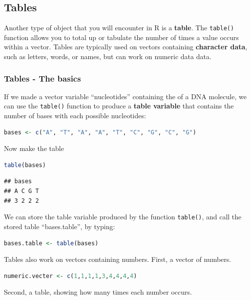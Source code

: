 \documentclass[
]{book}
\newcommand{\passthrough}[1]{#1}
\begin{document}
\hypertarget{tables}{%
\subsection{Tables}\label{tables}}

Another type of object that you will encounter in R is a \textbf{table}. The \passthrough{\lstinline!table()!} function allows you to total up or tabulate the number of times a value occurs within a vector. Tables are typically used on vectors containing \textbf{character data}, such as letters, words, or names, but can work on numeric data data.

\hypertarget{tables---the-basics}{%
\subsubsection{Tables - The basics}\label{tables---the-basics}}

If we made a vector variable ``nucleotides'' containing the of a DNA molecule, we can use the \passthrough{\lstinline!table()!} function to produce a \textbf{table variable} that contains the number of bases with each possible nucleotides:

\begin{lstlisting}[language=R]
bases <- c("A", "T", "A", "A", "T", "C", "G", "C", "G")
\end{lstlisting}

Now make the table

\begin{lstlisting}[language=R]
table(bases)
\end{lstlisting}

\begin{lstlisting}
## bases
## A C G T 
## 3 2 2 2
\end{lstlisting}

We can store the table variable produced by the function \passthrough{\lstinline!table()!}, and call the stored table ``bases.table'', by typing:

\begin{lstlisting}[language=R]
bases.table <- table(bases)
\end{lstlisting}

Tables also work on vectors containing numbers. First, a vector of numbers.

\begin{lstlisting}[language=R]
numeric.vecter <- c(1,1,1,1,3,4,4,4,4)
\end{lstlisting}

Second, a table, showing how many times each number occurs.
\end{document}
